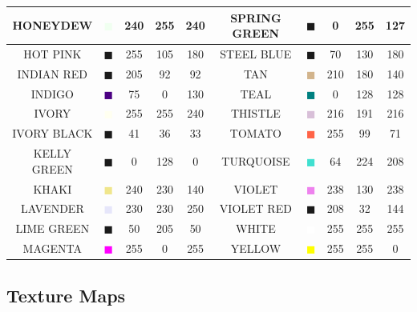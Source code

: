 \documentclass[11pt]{book}
\begin{document}
\begin{table}[p]
\begin{center}
\begin{tabular}{|c|c|c|c|c|c||c|c|c|c|}
{\ct HONEYDEW} & \textcolor{HONEYDEW} {$\blacksquare$} & 240& 255& 240& {\ct SPRING GREEN} &  \textcolor{SPRING GREEN} {$\blacksquare$} & 0& 255& 127  \\ \hline
{\ct HOT PINK} & \textcolor{HOT PINK} {$\blacksquare$} & 255& 105& 180& {\ct STEEL BLUE} &  \textcolor{STEEL BLUE} {$\blacksquare$} & 70& 130& 180  \\ \hline
{\ct INDIAN RED} & \textcolor{INDIAN RED} {$\blacksquare$} & 205& 92& 92& {\ct TAN} &  \textcolor{TAN} {$\blacksquare$} & 210& 180& 140  \\ \hline
{\ct INDIGO} & \textcolor{INDIGO} {$\blacksquare$} & 75& 0& 130& {\ct TEAL} &  \textcolor{TEAL} {$\blacksquare$} & 0& 128& 128  \\ \hline
{\ct IVORY} & \textcolor{IVORY} {$\blacksquare$} & 255& 255& 240& {\ct THISTLE} &  \textcolor{THISTLE} {$\blacksquare$} & 216& 191& 216  \\ \hline
{\ct IVORY BLACK} & \textcolor{IVORY BLACK} {$\blacksquare$} & 41& 36& 33& {\ct TOMATO } &  \textcolor{TOMATO } {$\blacksquare$} & 255& 99& 71  \\ \hline
{\ct KELLY GREEN} & \textcolor{KELLY GREEN} {$\blacksquare$} & 0& 128& 0& {\ct TURQUOISE} &  \textcolor{TURQUOISE} {$\blacksquare$} & 64& 224& 208  \\ \hline
{\ct KHAKI} & \textcolor{KHAKI} {$\blacksquare$} & 240& 230& 140& {\ct VIOLET} &  \textcolor{VIOLET} {$\blacksquare$} & 238& 130& 238  \\ \hline
{\ct LAVENDER} & \textcolor{LAVENDER} {$\blacksquare$} & 230& 230& 250& {\ct VIOLET RED} &  \textcolor{VIOLET RED} {$\blacksquare$} & 208& 32& 144  \\ \hline
{\ct LIME GREEN} & \textcolor{LIME GREEN} {$\blacksquare$} & 50& 205& 50& {\ct WHITE} &  \textcolor{WHITE} {$\blacksquare$} & 255& 255& 255  \\ \hline
{\ct MAGENTA} & \textcolor{MAGENTA} {$\blacksquare$} & 255& 0& 255& {\ct YELLOW} &  \textcolor{YELLOW} {$\blacksquare$} & 255& 255& 0  \\ \hline
\end{tabular}
\end{center}
\end{table}


\subsection{Texture Maps}
\label{info:texture_map}
\end{document}
